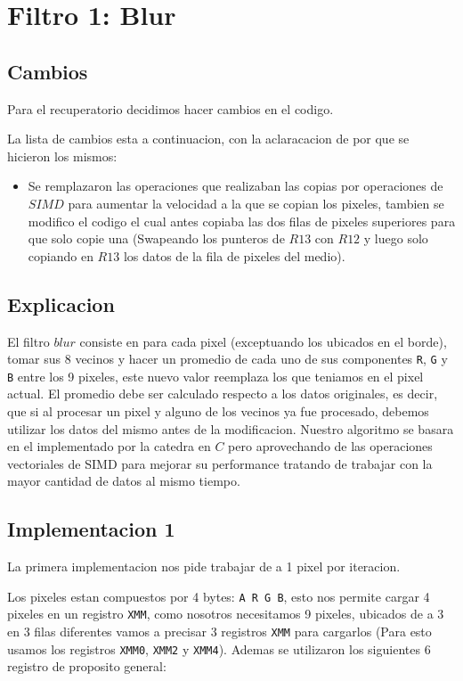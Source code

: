 \section{Filtro 1: Blur}

\subsection{Cambios}
Para el recuperatorio decidimos hacer cambios en el codigo.

La lista de cambios esta a continuacion, con la aclaracacion de por que se hicieron los mismos:
\noindent
\begin{itemize}
\item Se remplazaron las operaciones que realizaban las copias por operaciones de $SIMD$ para aumentar la velocidad a la que se copian los pixeles, tambien se modifico el codigo el cual antes copiaba las dos filas de pixeles superiores para que solo copie una (Swapeando los punteros de $R13$ con $R12$ y luego solo copiando en $R13$ los datos de la fila de pixeles del medio).
\end{itemize}

\subsection{Explicacion}

El filtro $blur$ consiste en para cada pixel (exceptuando los ubicados en el borde), tomar sus 8 vecinos y hacer un promedio de cada uno de sus componentes \texttt{R}, \texttt{G} y \texttt{B} entre los 9 pixeles, este nuevo valor reemplaza los que teniamos en el pixel actual. El promedio debe ser calculado respecto a los datos originales, es decir, que si al procesar un pixel y alguno de los vecinos ya fue procesado, debemos utilizar los datos del mismo antes de la modificacion. Nuestro algoritmo se basara en el implementado por la catedra en $C$ pero aprovechando de las operaciones vectoriales de SIMD para mejorar su performance tratando de trabajar con la mayor cantidad de datos al mismo tiempo.

\subsection{Implementacion 1}
La primera implementacion nos pide trabajar de a 1 pixel por iteracion.

Los pixeles estan compuestos por 4 bytes: \texttt{A R G B}, esto nos permite cargar 4 pixeles en un registro \texttt{XMM}, como nosotros necesitamos 9 pixeles, ubicados de a 3 en 3 filas diferentes vamos a precisar 3 registros \texttt{XMM} para cargarlos (Para esto usamos los registros \texttt{XMM0}, \texttt{XMM2} y \texttt{XMM4}). Ademas se utilizaron los siguientes 6 registro de proposito general: \\

